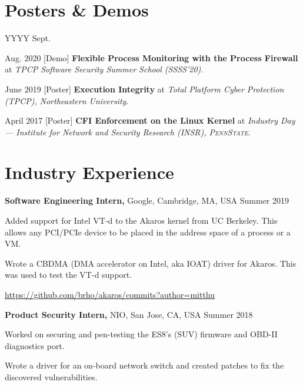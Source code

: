 \documentclass[margin]{res}
\newcommand{\psu}{\textsc{PennState}}
\begin{document}
\begin{resume}
\section{Posters \& Demos}

\begin{labeling}{YYYY Sept.}

\item[Aug. 2020] [Demo] \textbf{Flexible Process Monitoring with the Process Firewall} at \emph{TPCP Software Security Summer School (SSSS’20)}.

\item[June 2019] [Poster] \textbf{Execution Integrity} at \emph{Total Platform Cyber Protection (TPCP), Northeastern University}.

\item[April 2017] [Poster] \textbf{CFI Enforcement on the Linux Kernel} at \emph{Industry Day --- Institute for Network and Security Research (INSR), \psu}.

\end{labeling}

\section{Industry Experience}

{\bf Software Engineering Intern,} Google, Cambridge, MA, USA
\hfill Summer  2019 %
\begin{itemizeexp}
    \item Added support for Intel VT-d to the Akaros kernel from UC Berkeley.
    This allows any PCI/PCIe device to be placed in the address space of a process or a VM.
    \item Wrote a CBDMA (DMA accelerator on Intel, aka IOAT) driver for Akaros.
    This was used to test the VT-d support.
    \item \url{https://github.com/brho/akaros/commits?author=mitthu}
\end{itemizeexp}

{\bf Product Security Intern,} NIO, San Jose, CA, USA
\hfill Summer 2018 %
\begin{itemizeexp}
    \item Worked on securing and pen-testing the ES8's (SUV) firmware and
    OBD-II diagnostics port.
    \item Wrote a driver for an on-board network switch and created patches
    to fix the discovered vulnerabilities.
\end{itemizeexp}


\end{resume}
\end{document}
